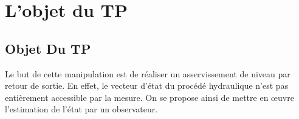 \chapter{ L'objet du TP }
 
  \section{Objet Du TP}
      Le but de cette manipulation est de réaliser un asservissement de niveau par retour de sortie. En effet, le vecteur d’état du procédé hydraulique n’est pas entièrement accessible par la mesure. On se propose ainsi de mettre en œuvre l’estimation de l’état par un observateur. \cite{ref1}
  
  